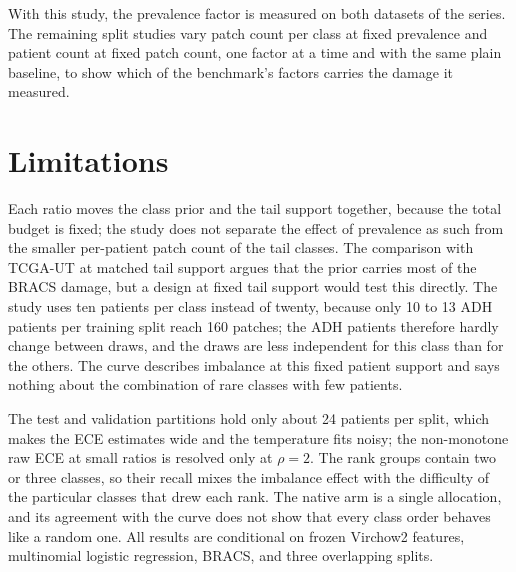 With this study, the prevalence factor is measured on both datasets of the series. The remaining split studies vary patch count per class at fixed prevalence and patient count at fixed patch count, one factor at a time and with the same plain baseline, to show which of the benchmark's factors carries the damage it measured.

\section{Limitations}
\label{sec:limitations}
Each ratio moves the class prior and the tail support together, because the total budget is fixed; the study does not separate the effect of prevalence as such from the smaller per-patient patch count of the tail classes. The comparison with TCGA-UT at matched tail support argues that the prior carries most of the BRACS damage, but a design at fixed tail support would test this directly. The study uses ten patients per class instead of twenty, because only 10 to 13 ADH patients per training split reach 160 patches; the ADH patients therefore hardly change between draws, and the draws are less independent for this class than for the others. The curve describes imbalance at this fixed patient support and says nothing about the combination of rare classes with few patients.

The test and validation partitions hold only about 24 patients per split, which makes the ECE estimates wide and the temperature fits noisy; the non-monotone raw ECE at small ratios is resolved only at $\rho=2$. The rank groups contain two or three classes, so their recall mixes the imbalance effect with the difficulty of the particular classes that drew each rank. The native arm is a single allocation, and its agreement with the curve does not show that every class order behaves like a random one. All results are conditional on frozen Virchow2 features, multinomial logistic regression, BRACS, and three overlapping splits.

